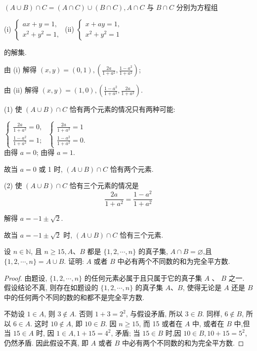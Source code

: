 \begin{solution}
	$(A \cup B) \cap C=(A \cap C) \cup(B \cap C), A \cap C$ 与 $B \cap C$ 分别为方程组

	(i) $\left\{\begin{array}{l}a x+y=1, \\ x^{2}+y^{2}=1,\end{array}\right.$
	\qquad
	(ii) $\left\{\begin{array}{l}x+a y=1, \\ x^{2}+y^{2}=1\end{array}\right.$

	的解集.

	由 (i) 解得 $(x, y)=(0,1),\left(\frac{2 a}{1+a^{2}}, \frac{1-a^{2}}{1+a^{2}}\right)$;

	由 (ii) 解得 $(x, y)=(1,0),\left(\frac{1-a^{2}}{1+a^{2}}, \frac{2 a}{1+a^{2}}\right)$.

	(1) 使 $(A \cup B) \cap C$ 恰有两个元素的情况只有两种可能:

	 $\left\{\begin{array}{l}\frac{2 a}{1+a^{2}}=0, \\ \frac{1-a^{2}}{1+a^{2}}=1 ;\end{array}\right.$
	\qquad
	 $\left\{\begin{array}{l}\frac{2 a}{1+a^{2}}=1 \\ \frac{1-a^{2}}{1+a^{2}}=0 .\end{array}\right.$\\
	由得 $a=0$; 由得 $a=1$.

	故当 $a=0$ 或 1 时, $(A \cup B) \cap C$ 恰有两个元素.

	(2) 使 $(A \cup B) \cap C$ 恰有三个元素的情况是
	$$
		\frac{2 a}{1+a^{2}}=\frac{1-a^{2}}{1+a^{2}}
	$$

	解得 $a=-1 \pm \sqrt{2}$.

	故当 $a=-1 \pm \sqrt{2}$ 时, $(A \cup B) \cap C$ 恰有三个元素.
\end{solution}

\begin{example}\label{ex:1.2.3}
	设 $n \in \mathbb{N}$, 且 $n \geqslant 15, A 、 B$ 都是 $\{1,2, \cdots, n\}$ 的真子集, $A \cap B=\varnothing$,且 $\{1,2, \cdots, n\}=A \cup B$. 证明: $A$ 或者 $B$ 中必有两个不同数的和为完全平方数.
\end{example}

\begin{proof}
	由题设, $\{1,2, \cdots, n\}$ 的任何元素必属于且只属于它的真子集 $A$ 、 $B$ 之一. 假设结论不真, 则存在如题设的 $\{1,2, \cdots, n\}$ 的真子集 $A 、 B$, 使得无论是 $A$ 还是 $B$ 中的任何两个不同的数的和都不是完全平方数.

	不妨设 $1 \in A$, 则 $3 \notin A$. 否则 $1+3=2^{2}$, 与假设矛盾, 所以 $3 \in B$. 同样, $6 \notin B$, 所以 $6 \in A$. 这时 $10 \notin A$, 即 $10 \in B$. 因 $n \geqslant 15$, 而 15 或者在 $A$ 中, 或者在 $B$ 中,但当 $15 \in A$ 时, 因 $1 \in A, 1+15=4^{2}$, 矛盾; 当 $15 \in B$ 时,因 $10 \in B, 10+15=5^{2}$, 仍然矛盾. 因此假设不真, 即 $A$ 或者 $B$ 中必有两个不同数的和为完全平方数.
\end{proof}

